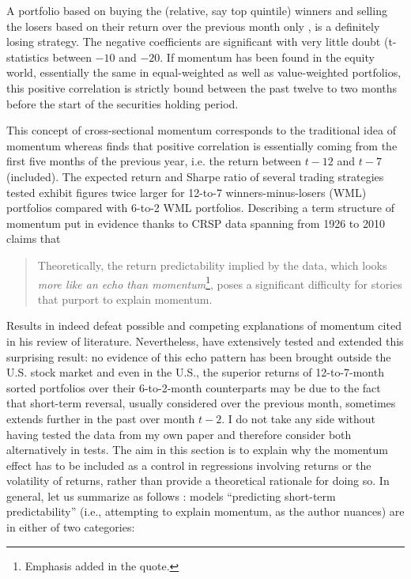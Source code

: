 A portfolio based on buying the (relative, say top quintile) winners and selling the losers based on their return over the previous month only \parencite{Novy-Marx2012}, is a definitely losing strategy. The negative coefficients are significant with very little doubt (t-statistics between $-10$ and $-20$. If momentum has been found in the equity world, essentially the same in equal-weighted as well as value-weighted portfolios, this positive correlation is strictly bound between the past twelve to two months before the start of the securities holding period.



This concept of cross-sectional momentum corresponds to the traditional idea of momentum whereas \textcite{Novy-Marx2012} finds that positive correlation is essentially coming from the first five months of the previous year, i.e. the return between $t-12$ and $t-7$ (included). The expected return and Sharpe ratio of several trading strategies tested exhibit figures twice larger for 12-to-7 winners-minus-losers (WML) portfolios compared with 6-to-2 WML portfolios. Describing a term structure of momentum put in evidence thanks to CRSP data spanning from 1926 to 2010 \textcite{Novy-Marx2012} claims that
\begin{quotation}
Theoretically, the return predictability implied by the data, which looks \emph{more like an echo than momentum}\footnote{Emphasis added in the quote.}, poses a significant difficulty for stories that purport to explain momentum.
\end{quotation}
Results in \textcite{Novy-Marx2012} indeed defeat possible and competing explanations of momentum cited in his review of literature. Nevertheless, \textcite{Goyal2015} have extensively tested and extended this surprising result: no evidence of this echo pattern has been brought outside the U.S. stock market and even in the U.S., the superior returns of 12-to-7-month sorted portfolios over their 6-to-2-month counterparts may be due to the fact that short-term reversal, usually considered over the previous month, sometimes extends further in the past over month $t-2$. I do not take any side without having tested the data from my own paper and therefore consider both alternatively in tests. The aim in this section is to explain why the momentum effect has to be included as a control in regressions involving returns or the volatility of returns, rather than provide a theoretical rationale for doing so. In general, let us summarize as follows : models ``predicting short-term predictability'' (i.e., attempting to explain momentum, as the author nuances) are in either of two categories:
